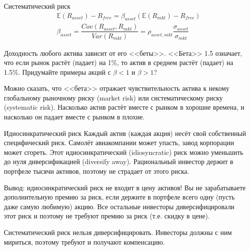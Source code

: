 \documentclass{beamer}
\begin{document}
\begin{frame}{Систематический риск}
\justify
\begin{align*}
&\mathbb{E}(R_{asset}) - R_{free} = \beta_{asset}(\mathbb{E}(R_{mkt}) - R_{free}) \\
&\beta_{asset} = \dfrac{Cov(R_{asset}, R_{mkt})}{Var(R_{mkt})} = \rho_{asset,mkt}\dfrac{\sigma_{asset}}{\sigma_{mkt}}
\end{align*}

Доходность любого актива зависит от его <<беты>>. <<Бета>> 1.5 означает, что если рынок растёт (падает) на 1\%, то актив в среднем растёт (падает) на 1.5\%. Придумайте примеры акций с $\beta<1$ и $\beta>1$?

\vspace{\baselineskip}
Можно сказать, что <<бета>> отражает чувствительность актива к некому глобальному рыночному риску (market risk) или систематическому риску (systematic risk). Насколько актив растёт вместе с рынком в хорошие времена, и насколько он падает вместе с рынком в плохие.
\end{frame}



\begin{frame}{Идиосинкратический риск}
\justify
Каждый актив (каждая акция) несёт свой собственный специфический риск. Самолёт авиакомпании может упасть, завод корпорации может сгореть. Этот идиосинкратический (idiosyncratic) риск можно уменьшить до нуля диверсификацией (diversify away). Рациональный инвестор держит в портфеле тысячи активов, поэтому не страдает от этого риска.

\vspace{\baselineskip}
Вывод: идиосинкратический риск не входит в цену активов! Вы не зарабатываете дополнительную премию за риск, если держите в портфеле всего одну (пусть даже самую любимую) акцию. Все остальные инвесторы диверсифицировали этот риск и поэтому не требуют премию за риск (т.е. скидку в цене).

\vspace{\baselineskip}
Систематический риск нельзя диверсифицировать. Инвесторы должны с ним мириться, поэтому требуют и получают компенсацию.
\end{frame}
\end{document}
